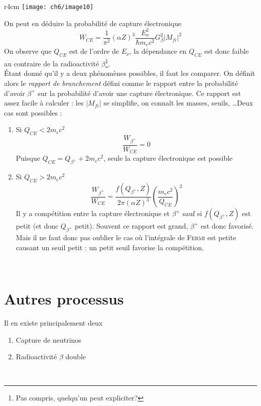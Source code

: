 	\begin{wrapfigure}[8]{r}{4cm}
	\vspace{-8mm}
	\texttt{[image: ch6/image10]}
	\end{wrapfigure}

On peut en déduire la probabilité de capture électronique
\begin{equation}
W_{CE} = \frac{1}{\pi^2}(\alpha Z)^3\dfrac{E_\nu^2}{\hbar m_ec^2}G_\beta^2|M_{fi}|^2
\end{equation}
On observe que $Q_{CE}$ est de l'ordre de $E_\nu$, la dépendance en $Q_{CE}$ est donc faible au 
contraire de la radioactivité $\beta$\footnote{Pas compris, quelqu'un peut expliciter?}.\\

Étant donné qu'il y a deux phénomènes possibles, il faut les comparer. On définit alors le
\textit{rapport de branchement} défini comme le rapport entre la probabilité d'avoir $\beta^+$ sur 
la probabilité d'avoir une capture électronique. Ce rapport est assez facile à calculer : les 
$|M_{fi}|$ se simplifie, on connaît les masses, seuils, \dots Deux cas sont possibles :
\begin{enumerate}
\item Si $Q_{CE} < 2m_ec^2$
\begin{equation}
\frac{W_{\beta^+}}{W_{CE}} =0
\end{equation}
Puisque $Q_{CE} = Q_{\beta^+}+2m_ec^2$, seule la capture électronique est possible
\item Si $Q_{CE} > 2m_ec^2$
\begin{equation}
\frac{W_{\beta^+}}{W_{CE}} =\dfrac{f(Q_{\beta^+},Z)}{2\pi(\alpha Z)^3}\left(\dfrac{m_ec^2}{Q_{CE}}\right)^2
\end{equation}
Il y a compétition entre la capture électronique et $\beta^+$ sauf si $f(Q_{\beta^+},Z)$ est petit
(et donc $Q_{\beta^+}$ petit). Souvent ce rapport est grand, $\beta^+$ est donc favorisé. Mais il ne faut 
donc pas oublier le cas où l'intégrale de \textsc{Fermi} est petite causant un seuil petit : un petit seuil favorise la compétition.
\end{enumerate}\ 


\section{Autres processus}
Il en existe principalement deux 
\begin{enumerate}
\item Capture de neutrinos
\item Radioactivité $\beta$ double
\end{enumerate}\ 

